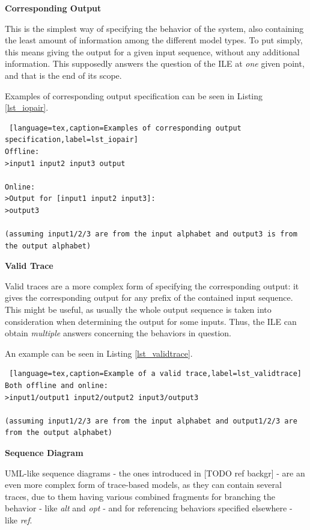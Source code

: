 \textbf{Corresponding Output}

This is the simplest way of specifying the behavior of the system, also containing the least amount of information among the different model types. To put simply, this means giving the output for a given input sequence, without any additional information. This supposedly answers the question of the ILE at \textit{one} given point, and that is the end of its scope.

Examples of corresponding output specification can be seen in Listing \ref{lst_iopair}.

\bigskip
\begin{lstlisting} [language=tex,caption=Examples of corresponding output specification,label=lst_iopair]
Offline: 
>input1 input2 input3 output

Online: 
>Output for [input1 input2 input3]:
>output3

(assuming input1/2/3 are from the input alphabet and output3 is from the output alphabet)
\end{lstlisting}

\textbf{Valid Trace}

Valid traces are a more complex form of specifying the corresponding output: it gives the corresponding output for any prefix of the contained input sequence. This might be useful, as usually the whole output sequence is taken into consideration when determining the output for some inputs. Thus, the ILE can obtain \textit{multiple} answers concerning the behaviors in question.

An example can be seen in Listing \ref{lst_validtrace}.

\bigskip
\begin{lstlisting} [language=tex,caption=Example of a valid trace,label=lst_validtrace]
Both offline and online:
>input1/output1 input2/output2 input3/output3

(assuming input1/2/3 are from the input alphabet and output1/2/3 are from the output alphabet) 
\end{lstlisting}

\textbf{Sequence Diagram}

UML-like sequence diagrams - the ones introduced in [TODO ref backgr] - are an even more complex form of trace-based models, as they can contain several traces, due to them having various combined fragments for branching the behavior - like \textit{alt} and \textit{opt} - and for referencing behaviors specified elsewhere - like \textit{ref}.

